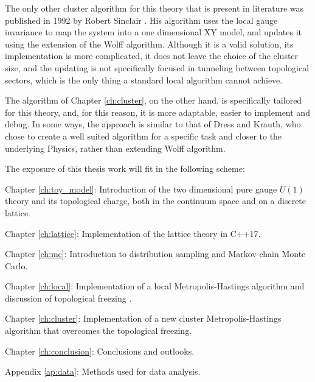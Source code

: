 The only other cluster algorithm for this theory that is present in literature was published in 1992 by Robert Sinclair \cite{sinclair:1992}.
His algorithm uses the local gauge invariance to map the system into a one dimensional XY model, and updates it using the extension of the Wolff algorithm.
Although it is a valid solution, its implementation is more complicated,
it does not leave the choice of the cluster size, and the updating is not specifically focused in tunneling between topological sectors,
which is the only thing a standard local algorithm cannot achieve. 

The algorithm of Chapter \ref{ch:cluster}, on the other hand, is specifically tailored for this theory, and,
for this reason, it is more adaptable, easier to implement and debug.
In some ways, the approach is similar to that of Dress and Krauth,
who chose to create a well suited algorithm for a specific task and closer to the underlying Physics, rather than extending Wolff algorithm.\bigskip\bigskip

\noindent
The exposure of this thesis work will fit in the following scheme:
\begin{description}
    \item{Chapter \ref{ch:toy_model}:}
        Introduction of the two dimensional pure gauge $U(1)$ theory and its topological charge,
        both in the continuum space and on a discrete lattice.
    \item{Chapter \ref{ch:lattice}:}
        Implementation of the lattice theory in C++17.
    \item{Chapter \ref{ch:mc}:}
        Introduction to distribution sampling and Markov chain Monte Carlo.
    \item{Chapter \ref{ch:local}:}
        Implementation of a local Metropolis-Hastings algorithm and discussion of topological freezing .
    \item{Chapter \ref{ch:cluster}:}
        Implementation of a new cluster Metropolis-Hastings algorithm that overcomes the topological freezing.
    \item{Chapter \ref{ch:conclusion}:}
        Conclusions and outlooks.\\
    \item{Appendix \ref{ap:data}:}
        Methods used for data analysis.
\end{description}

\endgroup

\vfill

